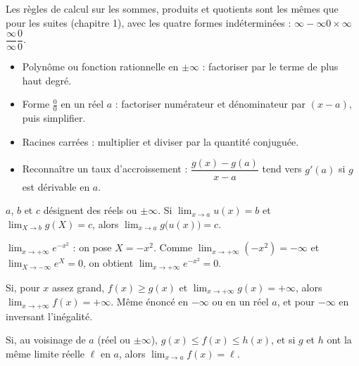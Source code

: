 Les règles de calcul sur les sommes, produits et quotients sont les mêmes que pour les suites
(chapitre 1), avec les quatre formes indéterminées :\quad
$\infty-\infty$\quad $0\times\infty$\quad $\dfrac{\infty}{\infty}$\quad $\dfrac{0}{0}$.

\begin{savoirfaire}
\begin{itemize}[label={\color{otGreenDark}\textbullet},leftmargin=1.4em,itemsep=0.6mm,topsep=0.5mm]
  \item Polynôme ou fonction rationnelle en $\pm\infty$ : factoriser par le terme de plus haut degré.
  \item Forme $\frac00$ en un réel $a$ : factoriser numérateur et dénominateur par $(x-a)$, puis simplifier.
  \item Racines carrées : multiplier et diviser par la quantité conjuguée.
  \item Reconnaître un taux d'accroissement : $\dfrac{g(x)-g(a)}{x-a}$ tend vers $g'(a)$ si $g$ est dérivable en $a$.
\end{itemize}
\end{savoirfaire}

\begin{theoreme}
$a$, $b$ et $c$ désignent des réels ou $\pm\infty$. Si $\displaystyle\lim_{x\to a}u(x)=b$ et
$\displaystyle\lim_{X\to b}g(X)=c$, alors $\displaystyle\lim_{x\to a}g\big(u(x)\big)=c$.
\end{theoreme}

\begin{exemple}
$\displaystyle\lim_{x\to+\infty}e^{-x^{2}}$ : on pose $X=-x^{2}$. Comme $\displaystyle\lim_{x\to+\infty}(-x^{2})=-\infty$
et $\displaystyle\lim_{X\to-\infty}e^{X}=0$, on obtient $\displaystyle\lim_{x\to+\infty}e^{-x^{2}}=0$.
\end{exemple}


\begin{theoreme}[Comparaison]
Si, pour $x$ assez grand, $f(x)\geq g(x)$ et $\displaystyle\lim_{x\to+\infty}g(x)=+\infty$, alors
$\displaystyle\lim_{x\to+\infty}f(x)=+\infty$. Même énoncé en $-\infty$ ou en un réel $a$, et pour $-\infty$
en inversant l'inégalité.
\end{theoreme}

\begin{theoreme}
Si, au voisinage de $a$ (réel ou $\pm\infty$), $g(x)\leq f(x)\leq h(x)$, et si $g$ et $h$ ont la même limite
réelle $\ell$ en $a$, alors $\displaystyle\lim_{x\to a}f(x)=\ell$.
\end{theoreme}

